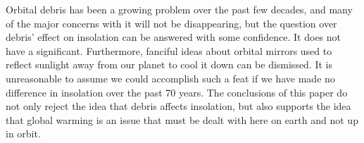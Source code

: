 \documentclass[11pt]{article}
\begin{document}
\begin{multicols*}{2}
Orbital debris has been a growing problem over the past few decades, and many of the major concerns with it will not be disappearing, but the question over debris' effect on insolation can be answered with some confidence. It does not have a significant. Furthermore, fanciful ideas about orbital mirrors used to reflect sunlight away from our planet to cool it down can be dismissed. It is unreasonable to assume we could accomplish such a feat if we have made no difference in insolation over the past 70 years. The conclusions of this paper do not only reject the idea that debris affects insolation, but also supports the idea that global warming is an issue that must be dealt with here on earth and not up in orbit.

\end{multicols*}
\end{document}
